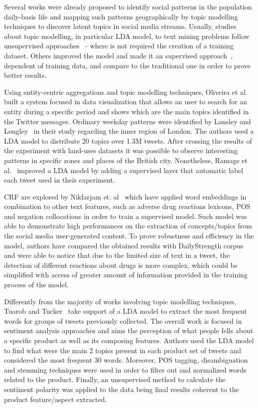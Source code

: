 Several works were already proposed to identify social patterns in the population daily-basis life and mapping such patterns geographically by topic modelling techniques to discover latent topics in social media streams. Usually, studies about topic modelling, in particular \gls{LDA} model, to text mining problems follow unsupervised approaches~\cite{lansley2016geography,oliveira2016sentibubbles} - where is not required the creation of a training dataset. Others improved the model and made it an supervised approach~\cite{ramage2010characterizing}, dependent of training data, and compare to the traditional one in order to prove better results.

Using entity-centric aggregations and topic modelling techniques, Oliveira et al.~\cite{oliveira2016sentibubbles} built a system focused in data visualization that allows an user to search for an entity during a specific period and shows which are the main topics identified in the Twitter messages.  Ordinary weekday patterns were identified by Lansley and Longley~\cite{lansley2016geography} in their study regarding the inner region of London. The authors used a \gls{LDA} model to distribute 20 topics over 1.3M tweets. After crossing the results of the experiment with land-uses datasets it was possible to observe interesting patterns in specific zones and places of the British city. Nonetheless, Ramage et al.~\cite{ramage2010characterizing} improved a \gls{LDA} model by adding a supervised layer that automatic label each tweet used in their experiment.

\gls{CRF} are explored by Nikfarjam et. al~\cite{nikfarjam2015pharmacovigilance} which have applied word embeddings in combination to other text features, such as adverse drug reactions lexicons, \gls{POS} and negation collocations in order to train a supervised model. Such model was able to demonstrate high performances on the extraction of concepts/topics from the social media user-generated content. To prove robustness and efficiency in the model, authors have compared the obtained results with DailyStrength corpus and were able to notice that due to the limited size of text in a tweet, the detection of different reactions about drugs is more complex, which could be simplified with access of greater amount of information provided in the training process of the model.

Differently from the majority of works involving topic modelling techniques, Tuarob and Tucker~\cite{tuarob2015quantifying} take support of a \gls{LDA} model to extract the most frequent words for groups of tweets previously collected. The overall work is focused in sentiment analysis approaches and aims the perception of what people fells about a specific product as well as its composing features. Authors used the \gls{LDA} model to find what were the main 2 topics present in each product set of tweets and considered the most frequent 30 words. Moreover, POS tagging, disambiguation and stemming techniques were used in order to filter out and normalized words related to the product. Finally, an unsupervised method to calculate the sentiment polarity was applied to the data being final results coherent to the product feature/aspect extracted.

